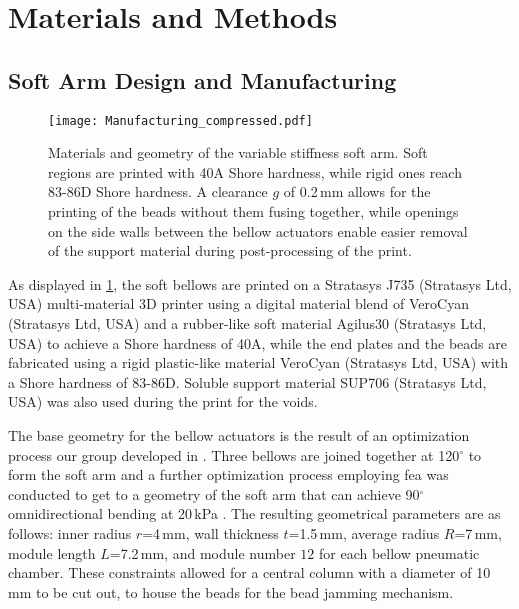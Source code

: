 \section{Materials and Methods}
\label{sec:methods}
\subsection{Soft Arm Design and Manufacturing}
\begin{figure}
    \centering
    \texttt{[image: Manufacturing\_compressed.pdf]}
    \caption{Materials and geometry of the variable stiffness soft arm. Soft regions are printed with 40A Shore hardness, while rigid ones reach 83-86D Shore hardness. A clearance $g$ of 0.2\,mm allows for the printing of the beads without them fusing together, while openings on the side walls between the bellow actuators enable easier removal of the support material during post-processing of the print. 
    }
    \label{fig:man}
\end{figure}
As displayed in \cref{fig:man}, the soft bellows are printed on a Stratasys J735 \textsuperscript{\textregistered} (Stratasys Ltd, USA) multi-material 3D printer using a digital material blend of VeroCyan\textsuperscript{\textregistered} (Stratasys Ltd, USA) and a rubber-like soft material Agilus30\textsuperscript{\textregistered} (Stratasys Ltd, USA) to achieve a Shore hardness of 40A, while the end plates and the beads are fabricated using a rigid plastic-like material VeroCyan\textsuperscript{\textregistered} (Stratasys Ltd, USA) with a Shore hardness of 83-86D. Soluble support material SUP706\textsuperscript{\textregistered} (Stratasys Ltd, USA) was also used during the print for the voids.

The base geometry for the bellow actuators is the result of an optimization process our group developed in \cite{bellow_actuator}. Three bellows are joined together at 120$^\circ$ to form the soft arm and a further optimization process employing \gls{fea} was conducted to get to a geometry of the soft arm that can achieve 90$^\circ$ omnidirectional bending at 20\,kPa \cite{bellowdesign2}. The resulting geometrical parameters are as follows: inner radius $r$=4\,mm, wall thickness $t$=1.5\,mm, average radius $R$=7\,mm, module length $L$=7.2\,mm, and module number $12$ for each bellow pneumatic chamber. These constraints allowed for a central column with a diameter of 10\,mm to be cut out, to house the beads for the bead jamming mechanism.

